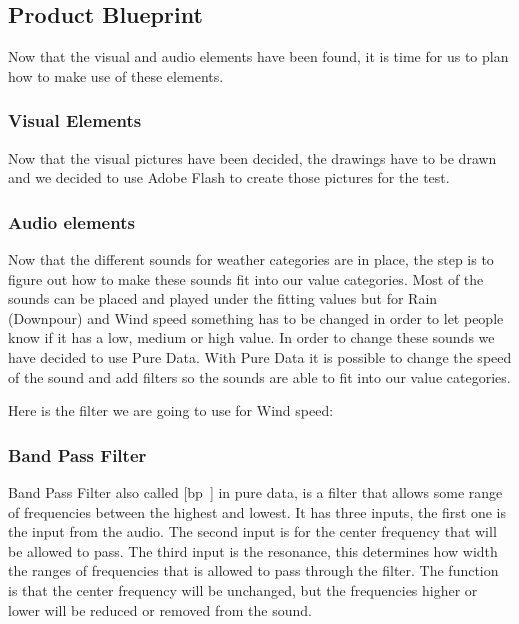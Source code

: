 

\subsection{Product Blueprint} %
\label{sub:product_blueprint}

Now that the visual and audio elements have been found, it is time for us to plan how to make use of these elements.

\subsubsection{Visual Elements} %
\label{ssub:visual_elements}

Now that the visual pictures have been decided, the drawings have to be drawn and we decided to use Adobe Flash to create those pictures for the test.



\subsubsection{Audio elements} %
\label{ssub:audio_elements}

Now that the different sounds for weather categories are in place, the step is to figure out how to make these sounds fit into our value categories.  
Most of the sounds can be placed and played under the fitting values but for Rain (Downpour) and Wind speed something has to be changed in order to let people know if it has a low, medium or high value. 
In order to change these sounds we have decided to use Pure Data. 
With Pure Data it is possible to change the speed of the sound and add filters so the sounds are able to fit into our value categories.  


Here is the filter we are going to use for Wind speed:


\subsubsection{Band Pass Filter} %
\label{ssub:band_pass_filter}

Band Pass Filter also called [bp~] in pure data, is a filter that allows some range of frequencies between the highest and lowest. 
It has three inputs, the first one is the input from the audio. 
The second input is for the center frequency that will be allowed to pass. 
The third input is the resonance, this determines how width the ranges of frequencies that is allowed to pass through the filter. 
The function is that the center frequency will be unchanged, but the frequencies higher or lower will be reduced or removed from the sound.

